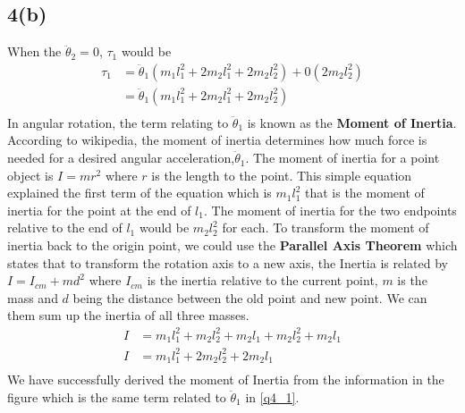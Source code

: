\subsection*{4(b)}
When the $ \ddot{\theta}_2 = 0$, $\tau_1$ would be
\begin{equation}\label{q4_1}
\begin{aligned}
\tau_1 &= \ddot{\theta}_1(m_1l_1^2 + 2 m_2 l_1^2 + 2 m_2 l_2^2) + 0(2 m_2 l_2^2)\\
&= \ddot{\theta}_1(m_1l_1^2 + 2 m_2 l_1^2 + 2 m_2 l_2^2)\\
\end{aligned}
\end{equation}
In angular rotation, the term relating to $\ddot{\theta}_1$ is known as the \textbf{Moment of Inertia}. According to wikipedia, the moment of inertia determines how much force is needed for a desired angular acceleration,$\ddot{\theta}_1$. The moment of inertia for a point object is $I = mr^2$ where $r$ is the length to the point. This simple equation explained the first term of the equation which is $m_1l_1^2$ that is the moment of inertia for the point at the end of $l_1$. The moment of inertia for the two endpoints relative to the end of $l_1$ would be $m_2l_2^2$ for each. To transform the moment of inertia back to the origin point, we could use the \textbf{Parallel Axis Theorem} which states that to transform the rotation axis to a new axis, the Inertia is related by $I = I_{cm} + md^2$ where $I_{cm}$ is the inertia relative to the current point, $m$ is the mass and $d$ being the distance between the old point and new point. We can them sum up the inertia of all three masses.
\begin{equation}
\begin{aligned}
I &= m_1l_1^2 + m_2l_2^2 + m_2l_1 + m_2l_2^2 + m_2l_1\\
I &= m_1l_1^2 + 2 m_2l_2^2 + 2 m_2l_1\\
\end{aligned}
\end{equation}
We have successfully derived the moment of Inertia from the information in the figure which is the same term related to $\ddot{\theta}_1$ in \ref{q4_1}.